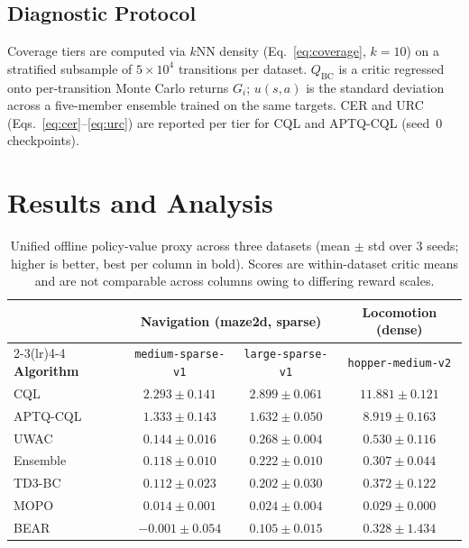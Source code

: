 \documentclass[conference]{IEEEtran}
\begin{document}
\subsection{Diagnostic Protocol}

Coverage tiers are computed via $k$NN density (Eq.~\ref{eq:coverage},
$k{=}10$) on a stratified subsample of $5{\times}10^{4}$ transitions per
dataset. $Q_{\mathrm{BC}}$ is a critic regressed onto per-transition Monte
Carlo returns $G_i$; $u(s,a)$ is the standard deviation across a five-member
ensemble trained on the same targets. CER and URC
(Eqs.~\ref{eq:cer}--\ref{eq:urc}) are reported per tier for CQL and
APTQ-CQL (seed~0 checkpoints).

\section{Results and Analysis}
\label{sec:results}

\begin{table}[t]
\centering
\caption{Unified offline policy-value proxy across three datasets
(mean $\pm$ std over 3 seeds; higher is better, best per column in bold).
Scores are within-dataset critic means and are not comparable across
columns owing to differing reward scales.}
\label{tab:perf}
\setlength{\tabcolsep}{12pt}
\begin{tabular}{lccc}
\toprule
 & \multicolumn{2}{c}{\textbf{Navigation (maze2d, sparse)}} & \textbf{Locomotion (dense)} \\
\cmidrule(lr){2-3}\cmidrule(lr){4-4}
\textbf{Algorithm} & \texttt{medium-sparse-v1} & \texttt{large-sparse-v1} & \texttt{hopper-medium-v2} \\
\midrule
CQL~\cite{kumar2020conservative}      & $\mathbf{2.293 \pm 0.141}$ & $\mathbf{2.899 \pm 0.061}$ & $\mathbf{11.881 \pm 0.121}$ \\
APTQ-CQL~\cite{liu2023aptq}           & $1.333 \pm 0.143$ & $1.632 \pm 0.050$ & $8.919 \pm 0.163$ \\
UWAC~\cite{wu2021uncertainty}         & $0.144 \pm 0.016$ & $0.268 \pm 0.004$ & $0.530 \pm 0.116$ \\
Ensemble~\cite{an2021pbrl}            & $0.118 \pm 0.010$ & $0.222 \pm 0.010$ & $0.307 \pm 0.044$ \\
TD3-BC~\cite{fujimoto2021td3bc}       & $0.112 \pm 0.023$ & $0.202 \pm 0.030$ & $0.372 \pm 0.122$ \\
MOPO~\cite{yu2020mopo}                & $0.014 \pm 0.001$ & $0.024 \pm 0.004$ & $0.029 \pm 0.000$ \\
BEAR~\cite{kumar2019bear}             & $-0.001 \pm 0.054$ & $0.105 \pm 0.015$ & $0.328 \pm 1.434$ \\
\bottomrule
\end{tabular}
\end{table}
\end{document}
